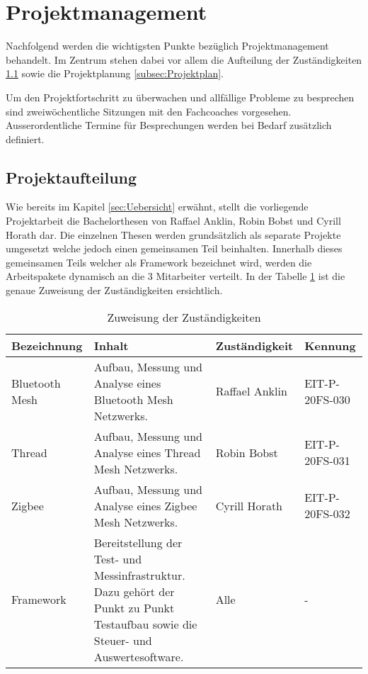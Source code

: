 \clearpage
\section{Projektmanagement}\label{sec:Projektmanagement}

Nachfolgend werden die wichtigsten Punkte bezüglich Projektmanagement behandelt. Im Zentrum stehen dabei vor allem die Aufteilung der Zuständigkeiten \ref{subsec:Projektaufteilung} sowie die Projektplanung \ref{subsec:Projektplan}.

Um den Projektfortschritt zu überwachen und allfällige Probleme zu besprechen sind zweiwöchentliche Sitzungen mit den Fachcoaches vorgesehen. Ausserordentliche Termine für Besprechungen werden bei Bedarf zusätzlich definiert.


\subsection{Projektaufteilung}\label{subsec:Projektaufteilung}

Wie bereits im Kapitel \ref{sec:Uebersicht} erwähnt, stellt die vorliegende Projektarbeit die Bachelorthesen von Raffael Anklin, Robin Bobst und Cyrill Horath dar. Die einzelnen Thesen werden grundsätzlich als separate Projekte umgesetzt welche jedoch einen gemeinsamen Teil beinhalten. Innerhalb dieses gemeinsamen Teils welcher als Framework bezeichnet wird, werden die Arbeitspakete dynamisch an die 3 Mitarbeiter verteilt. In der Tabelle \ref{tab:ZuweisungderZustaendigkeiten} ist die genaue Zuweisung der Zuständigkeiten ersichtlich.

\begin{table}[H]
     \centering
     	\begin{tabular}{ | p{2.5cm} | p{6cm} | p{2.7cm} | p{2.8cm} |}\hline
  		\textbf{Bezeichnung} & \textbf{Inhalt} & \textbf{Zuständigkeit} & \textbf{Kennung} \\ \hline
   
   Bluetooth Mesh & Aufbau, Messung und Analyse eines Bluetooth Mesh Netzwerks. & Raffael Anklin & EIT-P-20FS-030\\ \hline
   Thread & Aufbau, Messung und Analyse eines Thread Mesh Netzwerks. & Robin Bobst & EIT-P-20FS-031\\ \hline
   Zigbee & Aufbau, Messung und Analyse eines Zigbee Mesh Netzwerks. & Cyrill Horath & EIT-P-20FS-032 \\ \hline
   Framework & Bereitstellung der Test- und Messinfrastruktur. Dazu gehört der Punkt zu Punkt Testaufbau sowie die Steuer- und Auswertesoftware.  & Alle & - \\ \hline
   
 \end{tabular}
     \caption{Zuweisung der Zuständigkeiten}
     \label{tab:ZuweisungderZustaendigkeiten}
\end{table}





